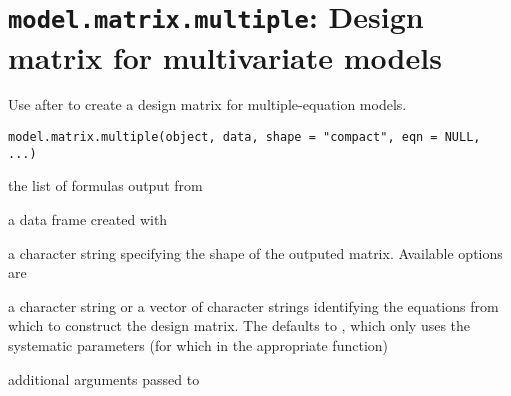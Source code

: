  \section{{\tt model.matrix.multiple}: Design matrix for multivariate models}\label{ss:model.matrix.multiple}
\begin{Description}\relax
Use  after  to
create a design matrix for multiple-equation models.
\end{Description}
\begin{Usage}
\begin{verbatim}
model.matrix.multiple(object, data, shape = "compact", eqn = NULL, ...)
\end{verbatim}
\end{Usage}
\begin{Arguments}
\begin{ldescription}
\item[\code{object}] the list of formulas output from 
\item[\code{data}] a data frame created with 
\item[\code{shape}] a character string specifying the shape of the outputed matrix.  Available options are 
\item[\code{eqn}] a character string or a vector of character strings identifying the equations from which to 
construct the design matrix. The defaults to , which only uses the systematic
parameters (for which  in the appropriate  function)
\item[\code{...}] additional arguments passed to 
\end{ldescription}
\end{Arguments}
